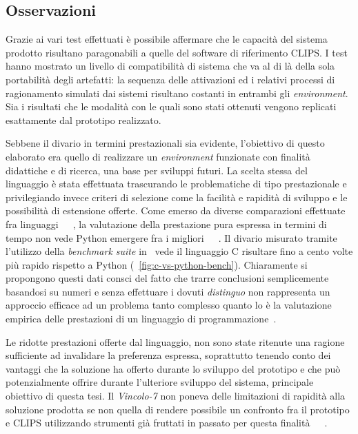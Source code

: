 \subsection{Osservazioni}

Grazie ai vari test effettuati è possibile affermare che le capacità del sistema prodotto risultano paragonabili a quelle del software di riferimento CLIPS. 
I test hanno mostrato un livello di compatibilità di sistema che va al di là della sola portabilità degli artefatti: la sequenza delle attivazioni ed i relativi processi di ragionamento simulati dai sistemi risultano costanti in entrambi gli \emph{environment}. Sia i risultati che le modalità con le quali sono stati ottenuti vengono replicati esattamente dal prototipo realizzato.

Sebbene il divario in termini prestazionali sia evidente, l'obiettivo di questo elaborato era quello di realizzare un \emph{environment} funzionate con finalità didattiche e di ricerca, una base per sviluppi futuri. La scelta stessa del linguaggio è stata effettuata trascurando le problematiche di tipo prestazionale e privilegiando invece criteri di selezione come la facilità e rapidità di sviluppo e le possibilità di estensione offerte. Come emerso da diverse comparazioni effettuate fra linguaggi~\cite{prashant2008}~\cite{prechelt2000}~\cite{naiditch1999}, la valutazione della prestazione pura espressa in termini di tempo non vede Python emergere fra i migliori~\cite{cpybench}~\cite{prashant2008}~\cite{prechelt2000}. Il divario misurato tramite l'utilizzo della \emph{benchmark suite} in~\cite{cpybench} vede il linguaggio C risultare fino a cento volte più rapido rispetto a Python (\figurename~\ref{fig:c-vs-python-bench}). Chiaramente si propongono questi dati consci del fatto che trarre conclusioni semplicemente basandosi su numeri e senza effettuare i dovuti \emph{distinguo} non rappresenta un approccio efficace ad un problema tanto complesso quanto lo è la valutazione empirica delle prestazioni di un linguaggio di programmazione~\cite{algorithms}. 

Le ridotte prestazioni offerte dal linguaggio, non sono state ritenute una ragione sufficiente ad invalidare la preferenza espressa, soprattutto tenendo conto dei vantaggi che la soluzione ha offerto durante lo sviluppo del prototipo e che può potenzialmente offrire durante l'ulteriore sviluppo del sistema, principale obiettivo di questa tesi. Il \emph{Vincolo-7} non poneva delle limitazioni di rapidità alla soluzione prodotta se non quella di rendere possibile un confronto fra il prototipo e CLIPS utilizzando strumenti già fruttati in passato per questa finalità~\cite{rbsbench}~\cite{ops5bench}~\cite{brantetal91}.


